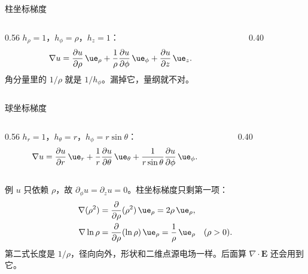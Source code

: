 \documentclass[fontset=windows, chinese, 10pt, xcolor=dvipsnames]{beamer}
\begin{document}
\begin{frame}{柱坐标梯度}
  \begin{columns}[c]
    \begin{column}{0.56\textwidth}
      $h_{\rho}=1$，$h_{\phi}=\rho$，$h_z=1$：
      \begin{equation*}
        \nabla u
        =\frac{\partial u}{\partial\rho}\,\ue_{\rho}
          +\frac{1}{\rho}\frac{\partial u}{\partial\phi}\,\ue_{\phi}
          +\frac{\partial u}{\partial z}\,\ue_z.
      \end{equation*}
      角分量里的 $1/\rho$ 就是 $1/h_{\phi}$。漏掉它，量纲就不对。
    \end{column}
    \begin{column}{0.40\textwidth}
      \centering
      \scalebox{0.85}{}
    \end{column}
  \end{columns}
\end{frame}

\begin{frame}{球坐标梯度}
  \begin{columns}[c]
    \begin{column}{0.56\textwidth}
      $h_r=1$，$h_{\theta}=r$，$h_{\phi}=r\sin\theta$：
      \begin{equation*}
        \nabla u
        =\frac{\partial u}{\partial r}\,\ue_r
          +\frac{1}{r}\frac{\partial u}{\partial\theta}\,\ue_{\theta}
          +\frac{1}{r\sin\theta}\frac{\partial u}{\partial\phi}\,\ue_{\phi}.
      \end{equation*}
    \end{column}
    \begin{column}{0.40\textwidth}
      \centering
      \scalebox{0.82}{}
    \end{column}
  \end{columns}
\end{frame}

\begin{frame}{例}
  $u$ 只依赖 $\rho$，故 $\partial_\phi u=\partial_z u=0$。柱坐标梯度只剩第一项：
  \begin{align*}
    \nabla(\rho^2)
    &=\frac{\partial}{\partial\rho}(\rho^2)\,\ue_{\rho}
     =2\rho\,\ue_{\rho},\\
    \nabla\ln\rho
    &=\frac{\partial}{\partial\rho}(\ln\rho)\,\ue_{\rho}
     =\frac{1}{\rho}\,\ue_{\rho}
     \quad(\rho>0).
  \end{align*}
  第二式长度是 $1/\rho$，径向向外，形状和二维点源电场一样。后面算 $\nabla\cdot\mathbf{E}$ 还会用到它。
\end{frame}
\end{document}
